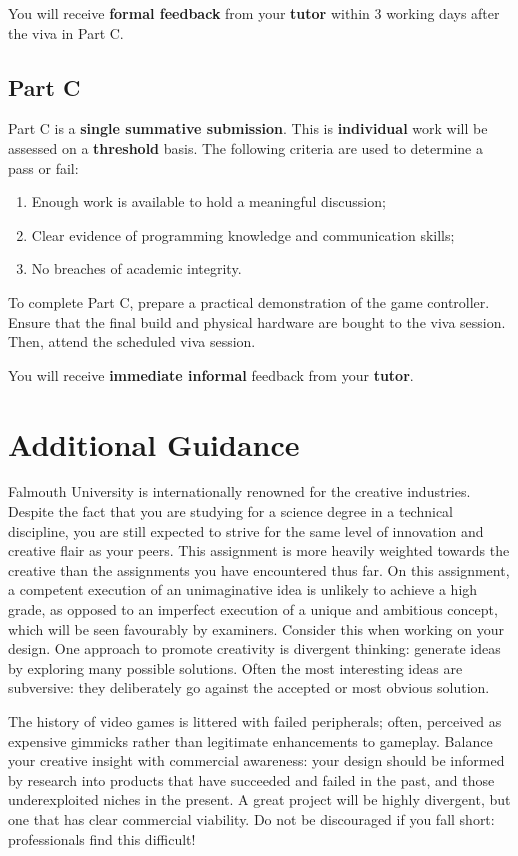 \documentclass{../../fal_assignment}
\begin{document}
You will receive \textbf{formal feedback} from your \textbf{tutor} within 3 working days after the viva in Part C.

\subsection*{Part C}

Part C is a \textbf{single summative submission}. This is \textbf{individual} work will be assessed on a \textbf{threshold} basis. The following criteria are used to determine a pass or fail: 

\begin{enumerate}[label=(\alph*)]
	\item Enough work is available to hold a meaningful discussion; 
	\item Clear evidence of programming knowledge and communication skills; 
	\item No breaches of academic integrity. 
\end{enumerate}

To complete Part C, prepare a practical demonstration of the game controller. Ensure that the final build and physical hardware are bought to the viva session. Then, attend the scheduled viva session. 

You will receive \textbf{immediate informal} feedback from your \textbf{tutor}.

\section*{Additional Guidance}
Falmouth University is internationally renowned for the creative industries. Despite the fact that you are studying for a science degree in a technical discipline, you are still expected to strive for the same level of innovation and creative flair as your peers. This assignment is more heavily weighted towards the creative than the assignments you have encountered thus far. On this assignment, a competent execution of an unimaginative idea is unlikely to achieve a high grade, as opposed to an imperfect execution of a unique and ambitious concept, which will be seen favourably by examiners. Consider this when working on your design. One approach to promote creativity is divergent thinking: generate ideas by exploring many possible solutions. Often the most interesting ideas are subversive: they deliberately go against the accepted or most obvious solution.

The history of video games is littered with failed peripherals; often, perceived as expensive gimmicks rather than legitimate enhancements to gameplay. Balance your creative insight with commercial awareness: your design should be informed by research into products that have succeeded and failed in the past, and those underexploited niches in the present. A great project will be highly divergent, but one that has clear commercial viability. Do not be discouraged if you fall short: professionals find this difficult! 
\end{document}

